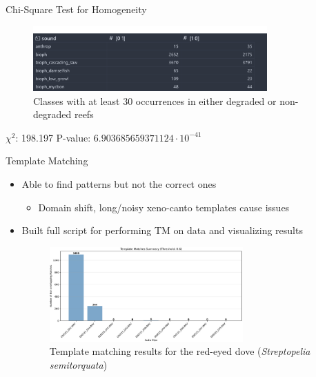 \begin{frame}{Chi-Square Test for Homogeneity}
    \begin{figure}
        \centering
        \includegraphics[height=0.8\textheight,width=0.8\textwidth,keepaspectratio]{images/chi_square_test.png}
        \caption{Classes with at least 30 occurrences in either degraded or non-degraded reefs}
    \end{figure}
    $\chi^2$: 198.197
    \newline
    P-value: $6.903685659371124 \cdot 10^{-41}$
\end{frame}

\begin{frame}{Template Matching}
    \begin{itemize}
        \item Able to find patterns but not the correct ones
            \begin{itemize}
                \item Domain shift, long/noisy xeno-canto templates cause issues
            \end{itemize}
        \item Built full script for performing TM on data and visualizing results
        \begin{figure}
            \centering
            \includegraphics[height=0.7\textheight,width=0.7\textwidth,keepaspectratio]{images/template_matching.png}
            \caption{Template matching results for the red-eyed dove (\textit{Streptopelia semitorquata})}
        \end{figure}
    \end{itemize}
\end{frame}


